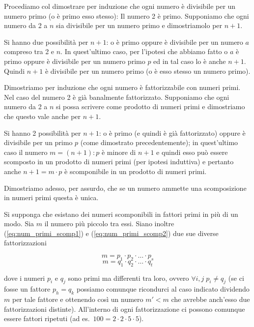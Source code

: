 Procediamo col dimostrare per induzione che ogni numero è divisibile per un numero primo (o è primo esso stesso): Il numero 2 è primo. Supponiamo che ogni numero da 2 a $n$ sia divisibile per un numero primo e dimostriamolo per $n+1$.

Si hanno due possibilità per $n+1$: o è primo oppure è divisibile per un numero $a$ compreso tra 2 e $n$. In quest'ultimo caso, per l'ipotesi che abbiamo fatto o $a$ è primo oppure è divisibile per un numero primo $p$ ed in tal caso lo è anche $n+1$. Quindi $n+1$ è divisibile per un numero primo (o è esso stesso un numero primo).

Dimostriamo per induzione che ogni numero è fattorizzabile con numeri primi. Nel caso del numero 2 è già banalmente fattorizzato. Supponiamo che ogni numero da 2 a $n$ si possa scrivere come prodotto di numeri primi e dimostriamo che questo vale anche per $n+1$.

Si hanno 2 possibilità per $n+1$: o è primo (e quindi è già fattorizzato) oppure è divisibile per un primo $p$ (come dimostrato precedentemente); in quest'ultimo caso il numero $m=(n+1):p$ è minore di $n+1$ e quindi esso può essere scomposto in un prodotto di numeri primi (per ipotesi induttiva) e pertanto anche $n+1=m\cdot p$ è scomponibile in un prodotto di numeri primi.

Dimostriamo adesso, per assurdo, che se un numero ammette una scomposizione in numeri primi questa è unica.

Si supponga che esistano dei numeri scomponibili in fattori primi in più di un modo. Sia $m$ il numero più piccolo tra essi. Siano inoltre (\ref{eq:num_primi_scomp1}) e (\ref{eq:num_primi_scomp2}) due sue diverse fattorizzazioni

\begin{equation}\label{eq:num_primi_scomp1}
m = p_1 \cdot p_2 \cdot \ldots \cdot p_s
\end{equation}
\begin{equation}\label{eq:num_primi_scomp2}
m = q_1 \cdot q_2 \cdot \ldots \cdot q_t
\end{equation}

\noindent dove i numeri $p_i$ e $q_j$ sono primi ma differenti tra loro, ovvero $\forall i,j \; p_i \neq q_j$ (se ci fosse un fattore $p_h=q_k$ possiamo comunque ricondurci al caso indicato dividendo $m$ per tale fattore e ottenendo così un numero $m' < m$ che avrebbe anch'esso due fattorizzazioni distinte). All'interno di ogni fattorizzazione ci possono comunque essere fattori ripetuti (ad es.~$100 = 2\cdot 2\cdot 5\cdot 5$).

